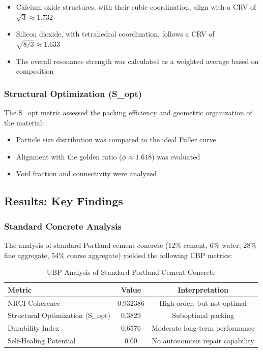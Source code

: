 \documentclass[11pt,a4paper]{article}
\begin{document}
\begin{itemize}
    \item Calcium oxide structures, with their cubic coordination, align with a CRV of $\sqrt{3} \approx 1.732$
    \item Silicon dioxide, with tetrahedral coordination, follows a CRV of $\sqrt{8/3} \approx 1.633$
    \item The overall resonance strength was calculated as a weighted average based on composition
\end{itemize}

\subsubsection{Structural Optimization (S\_opt)}

The S\_opt metric assessed the packing efficiency and geometric organization of the material:

\begin{itemize}
    \item Particle size distribution was compared to the ideal Fuller curve
    \item Alignment with the golden ratio ($\phi \approx 1.618$) was evaluated
    \item Void fraction and connectivity were analyzed
\end{itemize}

\subsection{Results: Key Findings}

\subsubsection{Standard Concrete Analysis}

The analysis of standard Portland cement concrete (12\% cement, 6\% water, 28\% fine aggregate, 54\% coarse aggregate) yielded the following UBP metrics:

\begin{table}[H]
\centering
\caption{UBP Analysis of Standard Portland Cement Concrete}
\begin{tabular}{lcc}
\toprule
\textbf{Metric} & \textbf{Value} & \textbf{Interpretation} \\
\midrule
NRCI Coherence & 0.932386 & High order, but not optimal \\
Structural Optimization (S\_opt) & 0.3829 & Suboptimal packing \\
Durability Index & 0.6576 & Moderate long-term performance \\
Self-Healing Potential & 0.00 & No autonomous repair capability \\
\bottomrule
\end{tabular}
\end{table}
\end{document}
